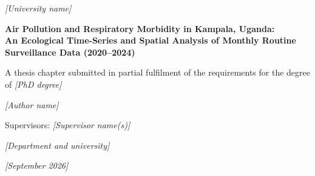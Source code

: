 \documentclass[12pt,a4paper]{report}
\newcommand{\placeholder}[1]{\textit{[#1]}}
\begin{document}
\begin{titlepage}
\centering
\vspace*{2cm}
{\Large \placeholder{University name} \par}
\vspace{1.5cm}
{\Large\bfseries Air Pollution and Respiratory Morbidity in Kampala, Uganda:\\
An Ecological Time-Series and Spatial Analysis of Monthly Routine Surveillance Data (2020--2024)\par}
\vspace{1.5cm}
{\large A thesis chapter submitted in partial fulfilment of the requirements for the degree of \placeholder{PhD degree}\par}
\vspace{1.5cm}
{\large \placeholder{Author name}\par}
\vfill
{\large Supervisors: \placeholder{Supervisor name(s)}\par}
\vspace{0.7cm}
{\large \placeholder{Department and university}\par}
\vspace{0.7cm}
{\large \placeholder{September 2026}\par}
\end{titlepage}

\end{document}

